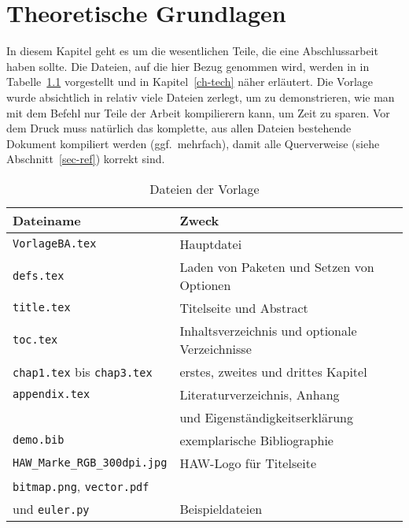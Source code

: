 \chapter{Theoretische Grundlagen}


In diesem Kapitel geht es um die wesentlichen Teile, die eine Abschlussarbeit
haben sollte.  Die Dateien, auf die hier Bezug genommen wird, werden in in
Tabelle~\ref{tab-files} vorgestellt und in Kapitel~\ref{ch-tech} näher
erläutert.  Die Vorlage wurde absichtlich in relativ viele Dateien zerlegt,
um zu demonstrieren, wie man mit dem Befehl \verb|| nur Teile der
Arbeit kompilierern kann, um Zeit zu sparen.  Vor dem Druck muss natürlich das
komplette, aus allen Dateien bestehende Dokument kompiliert werden (ggf.\
mehrfach), damit alle Querverweise (siehe Abschnitt~\ref{sec-ref}) korrekt
sind.

\begin{table}[!ht]
  \caption{Dateien der Vorlage}
  \centering
  \begin{tabular}{ll}
    \toprule
    Dateiname & Zweck \\
    \midrule
    \texttt{VorlageBA.tex} & Hauptdatei \\
    \texttt{defs.tex} & Laden von Paketen und Setzen von Optionen \\
    \texttt{title.tex} & Titelseite und Abstract \\
    \texttt{toc.tex} & Inhaltsverzeichnis und optionale Verzeichnisse \\
    \texttt{chap1.tex} bis \texttt{chap3.tex} & erstes, zweites und drittes Kapitel \\
    \texttt{appendix.tex} & Literaturverzeichnis, Anhang \\
    & und Eigenständigkeitserklärung \\
    \texttt{demo.bib} & exemplarische Bibliographie \\[3pt]
    \verb|HAW_Marke_RGB_300dpi.jpg| & HAW-Logo für Titelseite \\[3pt]
    \texttt{bitmap.png}, \texttt{vector.pdf} & \\
    und \texttt{euler.py} & Beispieldateien \\
    \bottomrule
  \end{tabular}
  \label{tab-files}
\end{table}

